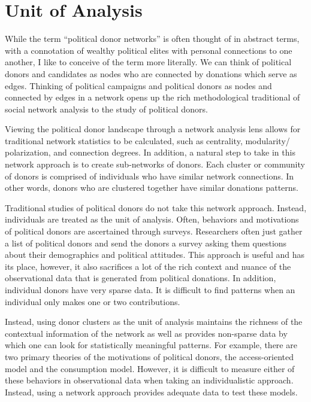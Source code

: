 \documentclass[12pt,]{article}
\author{\Large Ross Dahlke\vspace{0.05in} \newline\normalsize\emph{}  }
\date{}
\begin{document}
	
%




\vskip -8.5pt



\noindent \doublespacing 

\hypertarget{unit-of-analysis}{%
\section{Unit of Analysis}\label{unit-of-analysis}}

While the term ``political donor networks'' is often thought of in
abstract terms, with a connotation of wealthy political elites with
personal connections to one another, I like to conceive of the term more
literally. We can think of political donors and candidates as nodes who
are connected by donations which serve as edges. Thinking of political
campaigns and political donors as nodes and connected by edges in a
network opens up the rich methodological traditional of social network
analysis to the study of political donors.

Viewing the political donor landscape through a network analysis lens
allows for traditional network statistics to be calculated, such as
centrality, modularity/ polarization, and connection degrees. In
addition, a natural step to take in this network approach is to create
sub-networks of donors. Each cluster or community of donors is comprised
of individuals who have similar network connections. In other words,
donors who are clustered together have similar donations patterns.

Traditional studies of political donors do not take this network
approach. Instead, individuals are treated as the unit of analysis.
Often, behaviors and motivations of political donors are ascertained
through surveys. Researchers often just gather a list of political
donors and send the donors a survey asking them questions about their
demographics and political attitudes. This approach is useful and has
its place, however, it also sacrifices a lot of the rich context and
nuance of the observational data that is generated from political
donations. In addition, individual donors have very sparse data. It is
difficult to find patterns when an individual only makes one or two
contributions.

Instead, using donor clusters as the unit of analysis maintains the
richness of the contextual information of the network as well as
provides non-sparse data by which one can look for statistically
meaningful patterns. For example, there are two primary theories of the
motivations of political donors, the access-oriented model and the
consumption model. However, it is difficult to measure either of these
behaviors in observational data when taking an individualistic approach.
Instead, using a network approach provides adequate data to test these
models.
\end{document}
